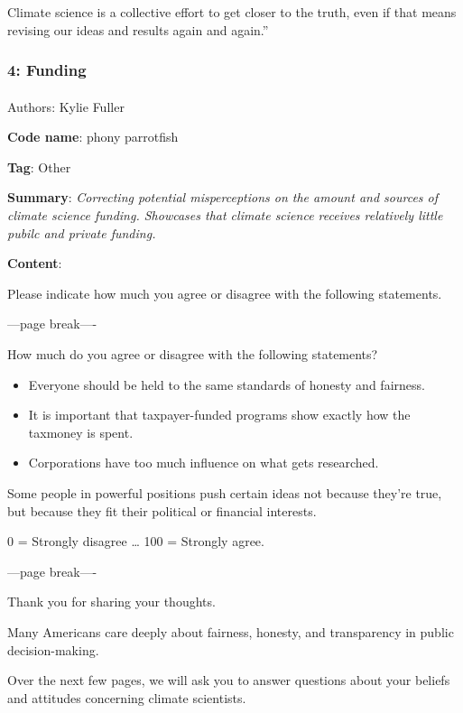 \documentclass[
  letterpaper,
  DIV=11,
  numbers=noendperiod]{scrartcl}
\makeatletter
\let\oldparagraph\paragraph
\renewcommand{\paragraph}{
    \@ifstar
      \xxxParagraphStar
      \xxxParagraphNoStar
  }
\newcommand{\xxxParagraphStar}[1]{\oldparagraph*{#1}\mbox{}}
\newcommand{\xxxParagraphNoStar}[1]{\oldparagraph{#1}\mbox{}}
\makeatother
\begin{document}
Climate science is a collective effort to get closer to the truth, even
if that means revising our ideas and results again and again.''

\subsubsection{4: Funding}\label{funding}

\paragraph{Authors: Kylie Fuller}\label{authors-kylie-fuller}

\textbf{Code name}: phony parrotfish

\textbf{Tag}: Other

\textbf{Summary}: \emph{Correcting potential misperceptions on the
amount and sources of climate science funding. Showcases that climate
science receives relatively little pubilc and private funding.}

\textbf{Content}:

Please indicate how much you agree or disagree with the following
statements.

---page break----

How much do you agree or disagree with the following statements?

\begin{itemize}
\item
  Everyone should be held to the same standards of honesty and fairness.
\item
  It is important that taxpayer-funded programs show exactly how the
  taxmoney is spent.
\item
  Corporations have too much influence on what gets researched.
\end{itemize}

Some people in powerful positions push certain ideas not because they're
true, but because they fit their political or financial interests.

0 = Strongly disagree \ldots{} 100 = Strongly agree.

---page break----

Thank you for sharing your thoughts.

Many Americans care deeply about fairness, honesty, and transparency in
public decision-making.

Over the next few pages, we will ask you to answer questions about your
beliefs and attitudes concerning climate scientists.
\end{document}
